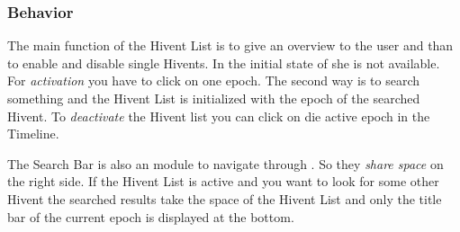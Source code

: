 \subsubsection{Behavior} %
\label{ssub:behaviour_hl}
The main function of the Hivent List is to give an overview to the user and than to enable and disable single Hivents. In the initial state of she is not available. For \textit{activation} you have to click on one epoch. The second way is to search something and the Hivent List is initialized with the epoch of the searched Hivent. To \textit{deactivate} the Hivent list you can click on die active epoch in the Timeline.

The Search Bar is also an module to navigate through \HG. So they \textit{share space} on the right side. If the Hivent List is active and you want to look for some other Hivent the searched results take the space of the Hivent List and only the title bar of the current epoch is displayed at the bottom.

